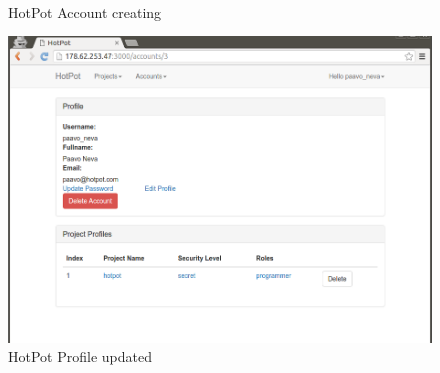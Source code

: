 \begin{figure}[bth]
\myfloatalign
{} \quad
{} \\
\caption[HotPot Account creation]{HotPot Account creating}
\label{fig:user_guide:account:edit_profile}
\end{figure}

\begin{figure}[bth]                                                                                                                                                  \myfloatalign
\includegraphics[width=1.0\linewidth]{gfx/chapter_5/account/profile_updated}
\caption[HotPot Profile updated]{HotPot Profile updated}
\label{fig:user_guide:account:profile_updated}
\end{figure}

